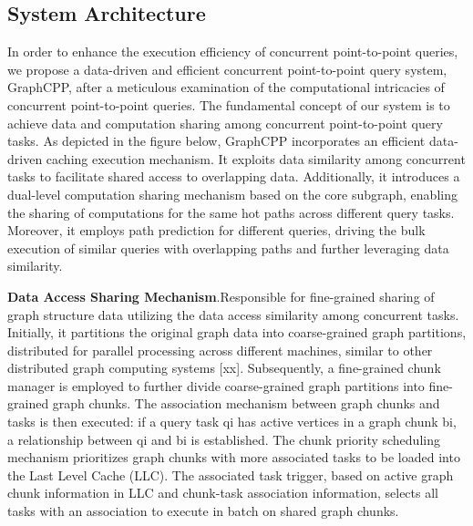 \documentclass[lettersize,journal]{IEEEtran} %
\begin{document}
\subsection{System Architecture}
In order to enhance the execution efficiency of concurrent point-to-point queries, we propose a data-driven and efficient concurrent point-to-point query system, GraphCPP, after a meticulous examination of the computational intricacies of concurrent point-to-point queries. The fundamental concept of our system is to achieve data and computation sharing among concurrent point-to-point query tasks. As depicted in the figure below, GraphCPP incorporates an efficient data-driven caching execution mechanism. It exploits data similarity among concurrent tasks to facilitate shared access to overlapping data. Additionally, it introduces a dual-level computation sharing mechanism based on the core subgraph, enabling the sharing of computations for the same hot paths across different query tasks. Moreover, it employs path prediction for different queries, driving the bulk execution of similar queries with overlapping paths and further leveraging data similarity.

{\bf{Data Access Sharing Mechanism}}.Responsible for fine-grained sharing of graph structure data utilizing the data access similarity among concurrent tasks. Initially, it partitions the original graph data into coarse-grained graph partitions, distributed for parallel processing across different machines, similar to other distributed graph computing systems [xx]. Subsequently, a fine-grained chunk manager is employed to further divide coarse-grained graph partitions into fine-grained graph chunks. The association mechanism between graph chunks and tasks is then executed: if a query task qi has active vertices in a graph chunk bi, a relationship between qi and bi is established. The chunk priority scheduling mechanism prioritizes graph chunks with more associated tasks to be loaded into the Last Level Cache (LLC). The associated task trigger, based on active graph chunk information in LLC and chunk-task association information, selects all tasks with an association to execute in batch on shared graph chunks.
\end{document}
